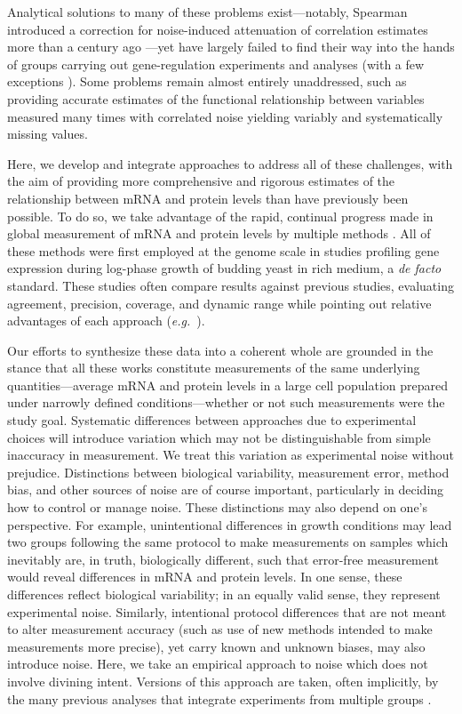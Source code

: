 \documentclass[10pt]{article}
\newcommand{\eg}{\textit{e.g.}}
\begin{document}
Analytical solutions to many of these problems exist---notably, Spearman introduced a correction for noise-induced attenuation of correlation estimates more than a century ago \cite{spearman04}---yet have largely failed to find their way into the hands of groups carrying out gene-regulation experiments and analyses (with a few exceptions \cite{Vogel2010}). Some problems remain almost entirely unaddressed, such as providing accurate estimates of the functional relationship between variables measured many times with correlated noise yielding variably and systematically missing values.

Here, we develop and integrate approaches to address all of these challenges, with the aim of providing more comprehensive and rigorous estimates of the relationship between mRNA and protein levels than have previously been possible. To do so, we take advantage of the rapid, continual progress made in global measurement of mRNA and protein levels by multiple methods \cite{velculescu97,holstege98,nagalakshmi08,lipson09,gygi99,ghaemmaghami03,newman06,lu07,degodoy08,lee11}. All of these methods were first employed at the genome scale in studies profiling gene expression during log-phase growth of budding yeast in rich medium, a \emph{de facto} standard. These studies often compare results against previous studies, evaluating agreement, precision, coverage, and dynamic range while pointing out relative advantages of each approach (\eg~\cite{nagalakshmi08,ingolia09,lipson09,ghaemmaghami03,lu07,degodoy08}).

Our efforts to synthesize these data into a coherent whole are grounded in the stance that all these works constitute measurements of the same underlying quantities---average mRNA and protein levels in a large cell population prepared under narrowly defined conditions---whether or not such measurements were the study goal. Systematic differences between approaches due to experimental choices will introduce variation which may not be distinguishable from simple inaccuracy in measurement. We treat this variation as experimental noise without prejudice. Distinctions between biological variability, measurement error, method bias, and other sources of noise are of course important, particularly in deciding how to control or manage noise. These distinctions may also depend on one's perspective. For example, unintentional differences in growth conditions may lead two groups following the same protocol to make measurements on samples which inevitably are, in truth, biologically different, such that error-free measurement would reveal differences in mRNA and protein levels. In one sense, these differences reflect biological variability; in an equally valid sense, they represent experimental noise. Similarly, intentional protocol differences that are not meant to alter measurement accuracy (such as use of new methods intended to make measurements more precise), yet carry known and unknown biases, may also introduce noise. Here, we take an empirical approach to noise which does not involve divining intent. Versions of this approach are taken, often implicitly, by the many previous analyses that integrate experiments from multiple groups \cite{lu07, ingolia09, ghaemmaghami03, siwiak10, vogel12}.
\end{document}
